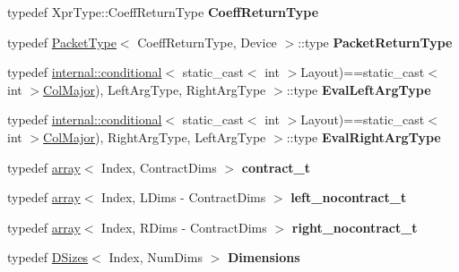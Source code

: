 \begin{DoxyCompactItemize}
\mbox{\label{struct_eigen_1_1_tensor_contraction_evaluator_base_a03e212da1d23eb224d3b92b81ad16c22}} 
typedef Xpr\+Type\+::\+Coeff\+Return\+Type {\bfseries Coeff\+Return\+Type}
\item 
\mbox{\label{struct_eigen_1_1_tensor_contraction_evaluator_base_aebff34eb713205655a84ce43bf1a01af}} 
typedef \hyperlink{struct_eigen_1_1_packet_type}{Packet\+Type}$<$ Coeff\+Return\+Type, Device $>$\+::type {\bfseries Packet\+Return\+Type}
\item 
\mbox{\label{struct_eigen_1_1_tensor_contraction_evaluator_base_ac0f70e0b1e4c1a617762ff7248fb5371}} 
typedef \hyperlink{struct_eigen_1_1internal_1_1conditional}{internal\+::conditional}$<$ static\+\_\+cast$<$ int $>$Layout)==static\+\_\+cast$<$ int $>$\hyperlink{group__enums_ggaacded1a18ae58b0f554751f6cdf9eb13a0cbd4bdd0abcfc0224c5fcb5e4f6669a}{Col\+Major}), Left\+Arg\+Type, Right\+Arg\+Type $>$\+::type {\bfseries Eval\+Left\+Arg\+Type}
\item 
\mbox{\label{struct_eigen_1_1_tensor_contraction_evaluator_base_afdccf7a61bf850b51079805d7e62873c}} 
typedef \hyperlink{struct_eigen_1_1internal_1_1conditional}{internal\+::conditional}$<$ static\+\_\+cast$<$ int $>$Layout)==static\+\_\+cast$<$ int $>$\hyperlink{group__enums_ggaacded1a18ae58b0f554751f6cdf9eb13a0cbd4bdd0abcfc0224c5fcb5e4f6669a}{Col\+Major}), Right\+Arg\+Type, Left\+Arg\+Type $>$\+::type {\bfseries Eval\+Right\+Arg\+Type}
\item 
\mbox{\label{struct_eigen_1_1_tensor_contraction_evaluator_base_ad6011a209a704e206b6f14452f776eb9}} 
typedef \hyperlink{class_eigen_1_1array}{array}$<$ Index, Contract\+Dims $>$ {\bfseries contract\+\_\+t}
\item 
\mbox{\label{struct_eigen_1_1_tensor_contraction_evaluator_base_aecf8b70a8ce67a760797426b71476193}} 
typedef \hyperlink{class_eigen_1_1array}{array}$<$ Index, L\+Dims -\/ Contract\+Dims $>$ {\bfseries left\+\_\+nocontract\+\_\+t}
\item 
\mbox{\label{struct_eigen_1_1_tensor_contraction_evaluator_base_a63853e163622ba5eb9e70f3889a45091}} 
typedef \hyperlink{class_eigen_1_1array}{array}$<$ Index, R\+Dims -\/ Contract\+Dims $>$ {\bfseries right\+\_\+nocontract\+\_\+t}
\item 
\mbox{\label{struct_eigen_1_1_tensor_contraction_evaluator_base_a1be9cbcba524958f7f37107fdc5a4c90}} 
typedef \hyperlink{struct_eigen_1_1_d_sizes}{D\+Sizes}$<$ Index, Num\+Dims $>$ {\bfseries Dimensions}
\end{DoxyCompactItemize}
